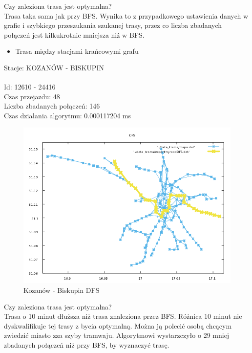 \documentclass[13pt]{article}
\begin{document}
Czy zaleziona trasa jest optymalna?\\
Trasa taka sama jak przy BFS. Wynika to z przypadkowego ustawienia danych w grafie i szybkiego przeszukania szukanej trasy, przez co liczba zbadanych połączeń jest kilkukrotnie mniejsza niż w BFS.

\newpage
\begin{itemize}
\item Trasa między stacjami krańcowymi grafu
\end{itemize}
\hspace{1.5cm}Stacje: KOZANÓW - BISKUPIN\\\\
Id: 12610   - 24416\\
Czas przejazdu: 48\\
Liczba zbadanych połączeń: 146\\
Czas działania algorytmu: 0.000117204 ms\\
\begin{figure}[hp]
\centering
\includegraphics[width=1\textwidth]{wykresy/KOZA_BIS_DFS.png}
\caption{Kozanów - Biskupin DFS}
\end{figure}

Czy zaleziona trasa jest optymalna?\\
Trasa o 10 minut dłuższa niż trasa znaleziona przez BFS. Różnica 10 minut nie dyskwalifikuje tej trasy z bycia optymalną. Można ją polecić osobą chcącym zwiedzić miasto zza szyby tramwaju. Algorytmowi wystarzczyło o 29 mniej zbadanych połączeń niż przy BFS, by wyznaczyć trasę.
\end{document}
